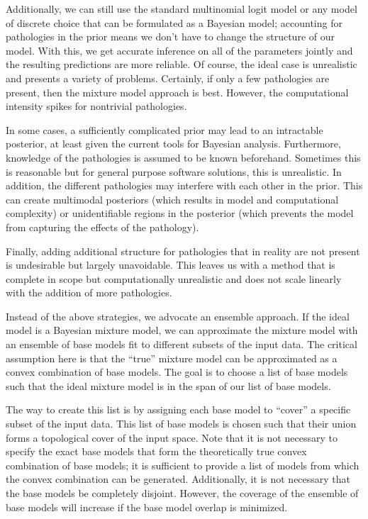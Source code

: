 \documentclass[12pt,titlepage]{mktg-article}
\begin{document}
Additionally, we can still use the standard multinomial logit model or any model of discrete choice that can be formulated as a Bayesian model; accounting for pathologies in the prior means we don't have to change the structure of our model. With this, we get accurate inference on all of the parameters jointly and the resulting predictions are more reliable. Of course, the ideal case is unrealistic and presents a variety of problems. Certainly, if only a few pathologies are present, then the mixture model approach is best. However, the computational intensity spikes for nontrivial pathologies.

In some cases, a sufficiently complicated prior may lead to an intractable posterior, at least given the current tools for Bayesian analysis. Furthermore, knowledge of the pathologies is assumed to be known beforehand. Sometimes this is reasonable but for general purpose software solutions, this is unrealistic. In addition, the different pathologies may interfere with each other in the prior. This can create multimodal posteriors (which results in model and computational complexity) or unidentifiable regions in the posterior (which prevents the model from capturing the effects of the pathology).

Finally, adding additional structure for pathologies that in reality are not present is undesirable but largely unavoidable. This leaves us with a method that is complete in scope but computationally unrealistic and does not scale linearly with the addition of more pathologies.

Instead of the above strategies, we advocate an ensemble approach. If the ideal model is a Bayesian mixture model, we can approximate the mixture model with an ensemble of base models fit to different subsets of the input data. The critical assumption here is that the ``true'' mixture model can be approximated as a convex combination of base models. The goal is to choose a list of base models such that the ideal mixture model is in the span of our list of base models.

The way to create this list is by assigning each base model to ``cover'' a specific subset of the input data. This list of base models is chosen such that their union forms a topological cover of the input space. Note that it is not necessary to specify the exact base models that form the theoretically true convex combination of base models; it is sufficient to provide a list of models from which the convex combination can be generated. Additionally, it is not necessary that the base models be completely disjoint. However, the coverage of the ensemble of base models will increase if the base model overlap is minimized.
\end{document}
